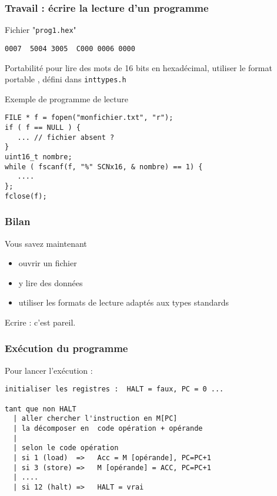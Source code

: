 \documentclass[]{beamer}
\begin{document}
\begin{frame}[containsverbatim]
  \frametitle{Travail : écrire la lecture d'un programme}

  \begin{block}{Fichier "\texttt{prog1.hex}"}
\begin{lstlisting}[frame=single]
0007  5004 3005  C000 0006 0000
\end{lstlisting}
  \end{block}

\alert{Portabilité} pour lire des mots de 16 bits en hexadécimal,
utiliser le format portable , défini dans
\texttt{inttypes.h}

  \begin{block}{Exemple de programme de lecture}
\begin{lstlisting}[style=sourceC]
FILE * f = fopen("monfichier.txt", "r");
if ( f == NULL ) {
   ... // fichier absent ?
}
uint16_t nombre;
while ( fscanf(f, "%" SCNx16, & nombre) == 1) {
   ....
};
fclose(f);
\end{lstlisting}    
  \end{block}

\end{frame}


\begin{frame}
\frametitle{Bilan}
Vous savez maintenant 
\begin{itemize}
\item ouvrir un fichier
\item y lire des données 
\item utiliser les formats de lecture adaptés aux types standards
\end{itemize}

Ecrire : c'est pareil.
\end{frame}

\begin{frame}[containsverbatim]
  \frametitle{Exécution du programme}
Pour lancer l'exécution :
\begin{lstlisting}[frame=single]
initialiser les registres :  HALT = faux, PC = 0 ...

tant que non HALT 
  | aller chercher l'instruction en M[PC]
  | la décomposer en  code opération + opérande
  |
  | selon le code opération
  | si 1 (load)  =>   Acc = M [opérande], PC=PC+1
  | si 3 (store) =>   M [opérande] = ACC, PC=PC+1
  | ....
  | si 12 (halt) =>   HALT = vrai
\end{lstlisting}
\end{frame}
\end{document}
